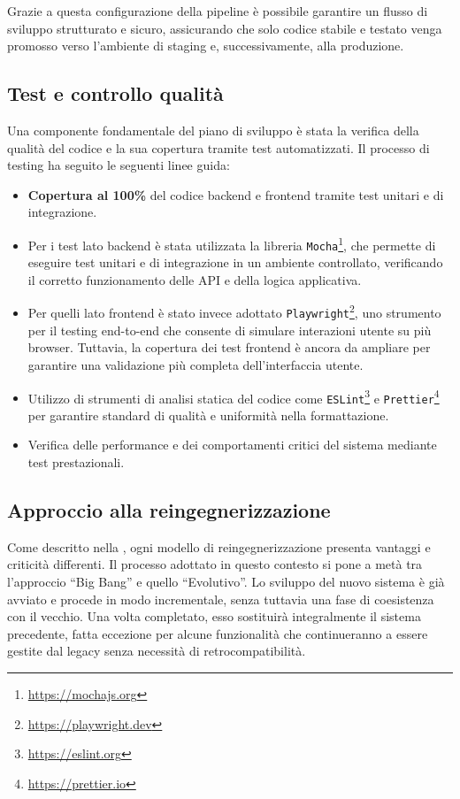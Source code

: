 Grazie a questa configurazione della pipeline è possibile garantire un flusso di sviluppo strutturato e sicuro, assicurando che solo codice stabile e testato venga promosso verso l'ambiente di staging e, successivamente, alla produzione.

\subsection{Test e controllo qualità}
Una componente fondamentale del piano di sviluppo è stata la verifica della qualità del codice e la sua copertura tramite test automatizzati. Il processo di testing ha seguito le seguenti linee guida:
\begin{itemize}
  \item \textbf{Copertura al 100\%} del codice backend e frontend tramite test unitari e di integrazione.
  \item Per i test lato backend è stata utilizzata la libreria \texttt{Mocha}\footnote{\url{https://mochajs.org}}, che permette di eseguire test unitari e di integrazione in un ambiente controllato, verificando il corretto funzionamento delle API e della logica applicativa.
  \item Per quelli lato frontend è stato invece adottato \texttt{Playwright}\footnote{\url{https://playwright.dev}}, uno strumento per il testing end-to-end che consente di simulare interazioni utente su più browser. Tuttavia, la copertura dei test frontend è ancora da ampliare per garantire una validazione più completa dell'interfaccia utente.
  \item Utilizzo di strumenti di analisi statica del codice come \texttt{ESLint}\footnote{\url{https://eslint.org}} e \texttt{Prettier}\footnote{\url{https://prettier.io}} per garantire standard di qualità e uniformità nella formattazione.
  \item Verifica delle performance e dei comportamenti critici del sistema mediante test prestazionali.
\end{itemize}

\subsection{Approccio alla reingegnerizzazione}
Come descritto nella , ogni modello di reingegnerizzazione presenta vantaggi e criticità differenti. Il processo adottato in questo contesto si pone a metà tra l'approccio ``Big Bang'' e quello ``Evolutivo''. Lo sviluppo del nuovo sistema è già avviato e procede in modo incrementale, senza tuttavia una fase di coesistenza con il vecchio. Una volta completato, esso sostituirà integralmente il sistema precedente, fatta eccezione per alcune funzionalità che continueranno a essere gestite dal legacy senza necessità di retrocompatibilità.

